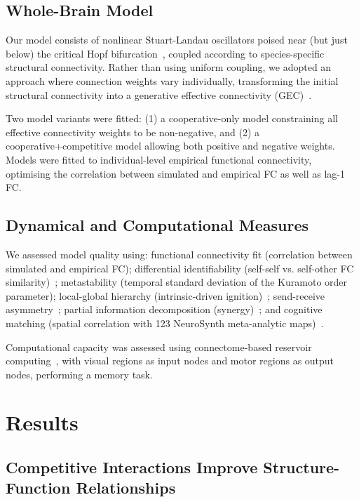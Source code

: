 \documentclass[11pt]{article}
\begin{document}
\subsection{Whole-Brain Model}

Our model consists of nonlinear Stuart-Landau oscillators poised near (but just below) the critical Hopf bifurcation~\citep{deco2017dynamics}, coupled according to species-specific structural connectivity. Rather than using uniform coupling, we adopted an approach where connection weights vary individually, transforming the initial structural connectivity into a generative effective connectivity (GEC)~\citep{gilson2020model}.

Two model variants were fitted: (1) a cooperative-only model constraining all effective connectivity weights to be non-negative, and (2) a cooperative+competitive model allowing both positive and negative weights. Models were fitted to individual-level empirical functional connectivity, optimising the correlation between simulated and empirical FC as well as lag-1 FC.

\subsection{Dynamical and Computational Measures}

We assessed model quality using: functional connectivity fit (correlation between simulated and empirical FC); differential identifiability (self-self vs. self-other FC similarity)~\citep{amico2018fingerprinting}; metastability (temporal standard deviation of the Kuramoto order parameter); local-global hierarchy (intrinsic-driven ignition)~\citep{deco2017hierarchy}; send-receive asymmetry~\citep{gilson2020model}; partial information decomposition (synergy)~\citep{rosas2019info}; and cognitive matching (spatial correlation with 123 NeuroSynth meta-analytic maps)~\citep{luppi2024cognitive}.

Computational capacity was assessed using connectome-based reservoir computing~\citep{suarez2021linking,suarez2024reservoir}, with visual regions as input nodes and motor regions as output nodes, performing a memory task.

\section{Results}

\subsection{Competitive Interactions Improve Structure-Function Relationships}
\end{document}
